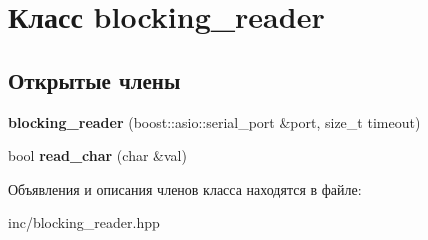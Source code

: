 \hypertarget{classblocking__reader}{}\section{Класс blocking\+\_\+reader}
\label{classblocking__reader}
\subsection*{Открытые члены}
\begin{DoxyCompactItemize}
\item 
\mbox{\label{classblocking__reader_a64407e195b4f2e595c8dad8f7393c026}} 
{\bfseries blocking\+\_\+reader} (boost\+::asio\+::serial\+\_\+port \&port, size\+\_\+t timeout)
\item 
\mbox{\label{classblocking__reader_adb1b562858477916c2d8821b3ed855f8}} 
bool {\bfseries read\+\_\+char} (char \&val)
\end{DoxyCompactItemize}


Объявления и описания членов класса находятся в файле\+:\begin{DoxyCompactItemize}
\item 
inc/blocking\+\_\+reader.\+hpp\end{DoxyCompactItemize}
